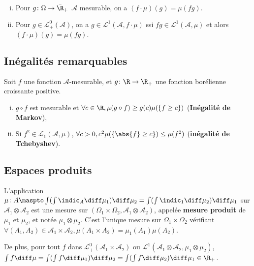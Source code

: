 	\begin{thm}
		\begin{enumerate}[(i)]
			\item Pour $g \colon \Omega \to \Bar\R_+$ $\mathcal{A}$ mesurable, on a $(f \cdot \mu)(g) = \mu(fg)$.
			\item Pour $g \in \mathcal{L}_+^0(\mathcal{A})$, on a $g \in \mathcal{L}^1(\mathcal{A}, f \cdot \mu)$ ssi $fg \in \mathcal{L}^1(\mathcal{A}, \mu)$ et alors $(f \cdot \mu)(g) = \mu(fg)$.
		\end{enumerate}
	\end{thm}


\subsection{Inégalités remarquables}

	\begin{thm}
		Soit $f$ une fonction $\mathcal{A}$-mesurable, et $g \colon \R \to \R_+$ une fonction borélienne croissante positive.
		\begin{enumerate}[(i)]
			\item $g \circ f$ est mesurable et $\forall c \in \R, \mu(g \circ f) \geq g(c) \mu(\{ f \geq c \})$ (\textbf{Inégalité de Markov}),
			\item Si $f^2 \in \mathcal{L}_1(\mathcal{A},\mu)$, $\forall c > 0, c^2 \mu(\{ \abs{f} \geq c \}) \leq \mu(f^2)$ (\textbf{inégalité de Tchebyshev}).
		\end{enumerate}
	\end{thm}


\subsection{Espaces produits}

	\begin{thm}
		L'application $\mu \colon A \maspto \int (\int \indic_A \diff \mu_1) \diff \mu_2 = \int (\int \indic_1 \diff \mu_2) \diff \mu_1$ sur $\mathcal{A}_1 \otimes \mathcal{A}_2$ est une mesure sur $(\Omega_1 \times \Omega_2, \mathcal{A}_1 \otimes \mathcal{A}_2)$, appelée \textbf{mesure produit} de $\mu_1$ et $\mu_2$, et notée $\mu_1 \otimes \mu_2$.
		C'est l'unique mesure sur $\Omega_1 \times \Omega_2$ vérifiant $\forall (A_1, A_2) \in \mathcal{A}_1 \times \mathcal{A}_2, \mu(A_1 \times A_2) = \mu_1(A_1) \mu(A_2)$.
		
		De plus, pour tout $f$ dans $\mathcal{L}^0_+(\mathcal{A}_1 \times \mathcal{A}_2)$ ou $\mathcal{L}^1(\mathcal{A}_1 \otimes \mathcal{A}_2, \mu_1 \otimes \mu_2)$, $\int f \diff \mu = \int (\int f \diff \mu_1) \diff \mu_2 = \int(\int f \diff \mu_2) \diff \mu_1 \in \Bar{\R}_+$.
	\end{thm}

